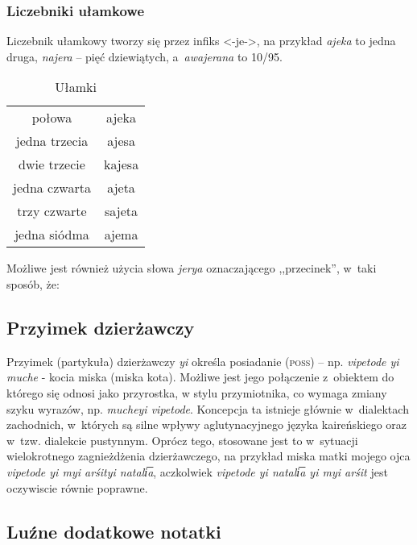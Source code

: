 \begin{spacing}{1.1}
\subsubsection{Liczebniki ułamkowe}

Liczebnik ułamkowy tworzy się przez infiks <-je->, na przykład \emph{ajeka} to
jedna druga, \emph{najera} -- pięć dziewiątych, a~\emph{awajerana} to 10/95.

\begin{table}[ht]
	\centering
	\caption{Ułamki}
	\begin{tabular}{cc} \toprule
		połowa & ajeka \\
		jedna trzecia & ajesa \\
		dwie trzecie & kajesa \\
		jedna czwarta & ajeta \\
		trzy czwarte & sajeta \\
		jedna siódma & ajema  \\\bottomrule
	\end{tabular}
	\label{tab:numerals4}
\end{table}

Możliwe jest również użycia słowa \emph{jerya} oznaczającego ,,przecinek'',
w~taki sposób, że:


\subsection{Przyimek dzierżawczy}

Przyimek (partykuła) dzierżawczy \emph{yi} określa posiadanie (\textsc{poss}) --
np. \emph{vipetode yi muche} - kocia miska (miska kota). Możliwe jest jego
połączenie z~obiektem do którego się odnosi jako przyrostka, w stylu
przymiotnika, co wymaga zmiany szyku wyrazów, np. \emph{mucheyi vipetode}.
Koncepcja ta istnieje głównie w~dialektach zachodnich, w~których są silne wpływy
aglutynacyjnego języka kaireńskiego oraz w~tzw. dialekcie pustynnym. Oprócz
tego, stosowane jest to w~sytuacji wielokrotnego zagnieżdżenia dzierżawczego, na
przykład miska matki mojego ojca \emph{vipetode yi myi arśityi natali͞a},
aczkolwiek \emph{vipetode yi natali͞a yi myi arśit} jest oczywiscie równie
poprawne.

\subsection{Luźne dodatkowe notatki}


\end{spacing}
